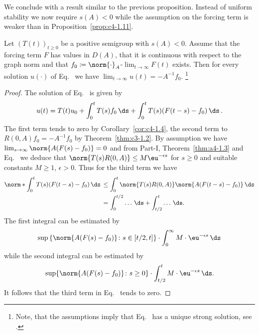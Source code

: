 We conclude with a result similar to the previous proposition.
Instead of uniform stability we now require $s(A) < 0$ while the assumption on the forcing term is weaker than in Proposition~\ref{prop:c4-1.11}.

\begin{proposition}\label{prop:c4-1.12}
Let $(T(t))_{t \geq 0}$ be a positive semigroup with $s(A) < 0$.
Assume that the forcing term $F$ has values in $D(A)$, that it is continuous with respect to the graph norm and that $f_{0} \coloneq  \norm{\cdot}_{A}$-$\lim_{t \to \infty} F(t)$ exists.
Then for every solution $u(\cdot)$ of Eq.~ we have $\lim_{t \to \infty} u(t) = -A^{-1}f_{0}$.
\footnote{Note, that the assumptions imply that Eq.~ has a unique strong solution, see \textcite[ Theorem~4.2.4]{pazy:1983}.}
\end{proposition}
\begin{proof}
The solution of Eq.~ is given by
\begin{equation}\label{eq:c4-1.8}
u(t) = T(t)u_{0} + \int_{0}^{t} T(s)f_{0} \, \ds + \int_{0}^{t} T(s)(F(t-s)-f_{0}) \, \ds\,.
\end{equation}
The first term tends to zero by Corollary~\ref{cor:c4-1.4},  
the second term to $R(0,A)f_{0} = -A^{-1}f_{0}$ by Theorem~\ref{thm:c3-1.2}.
By assumption we have $\lim_{s \to \infty}\norm{A(F(s)-f_{0})} = 0$ and from Part-I,
Theorem~\ref{thm:a4-1.3} and Eq.~ we deduce that $\norm{T(s)R(0,A)} \leq M\eu^{-\epsilon s}$ for $s \geq 0$ and suitable constants $M \geq 1$, $\epsilon > 0$.
Thus for the third term we have
\begin{align*}
 \norm*{\int_{0}^{t} T(s)(F(t-s)-f_{0}) \, \ds\,} &\leq \int_{0}^{t} \norm{T(s)R(0,A)} \norm{A(F(t-s)-f_{0})} \, \ds \\
&= \int_{0}^{t/2} \ldots \, \ds + \int_{t/2}^{t} \ldots \, \ds.
\end{align*}
The first integral can be estimated by
\[
 \sup  \left\{\norm{A(F(s)-f_{0})} \colon s \in 
 \left[ t/2 , t \right] \right\} 
\cdot \int_{0}^{\infty} M \cdot \eu^{-\epsilon s} \, \ds
\]
while the second integral can be estimated by 
\[
\sup\{\norm{A(F(s)-f_{0})} \colon s \geq 0\}
\cdot \int_{t/2}^{t} M \cdot \eu^{- \epsilon s} \, \ds.
\]
It follows that the third term in Eq.~ tends to zero.
\end{proof}
\clearpage
